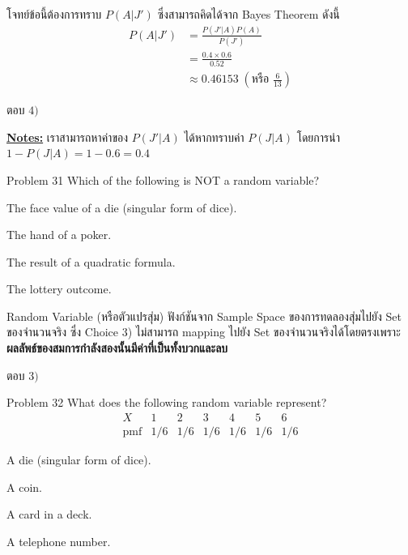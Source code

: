 \documentclass[11pt]{scrartcl}
\begin{document}
\begin{solutionbox}
  โจทย์ข้อนี้ต้องการทราบ $P(A|J')$ ซึ่งสามารถคิดได้จาก Bayes Theorem ดังนี้
  \begin{align*}
    P(A|J') &= \frac{P(J'|A)P(A)}{P(J')} \\
          &= \frac{0.4 \times 0.6}{0.52} \\
          &\approx 0.46153 \; \left(\text{หรือ } \frac{6}{13}\right)
  \end{align*}
  
  ตอบ $\boxed{4)}$

  \underline{\textbf{Notes:}}
  เราสามารถหาค่าของ $P(J'|A)$ ได้หากทราบค่า $P(J|A)$ โดยการนำ $1 - P(J|A) = 1-0.6 = 0.4$
\end{solutionbox}

\begin{problembox}{Problem 31}
Which of the following is NOT a random variable?
 
\begin{choices}
\item The face value of a die (singular form of dice).
\item The hand of a poker.
\item The result of a quadratic formula.
\item The lottery outcome.
\end{choices}
\end{problembox}

\begin{solutionbox}
  Random Variable (หรือตัวแปรสุ่ม) ฟังก์ชันจาก Sample Space ของการทดลองสุ่มไปยัง Set ของจำนวนจริง
  ซึ่ง Choice 3) ไม่สามารถ mapping ไปยัง Set ของจำนวนจริงได้โดยตรงเพราะ\textbf{ผลลัพธ์ของสมการกำลังสองนั้นมีค่าที่เป็นทั้งบวกและลบ}

  ตอบ $\boxed{3)}$
\end{solutionbox}

\begin{problembox}{Problem 32}
What does the following random variable represent?
\[
\begin{array}{c|cccccc}
X & 1 & 2 & 3 & 4 & 5 & 6 \\
\hline
\text{pmf} & 1/6 & 1/6 & 1/6 & 1/6 & 1/6 & 1/6
\end{array}
\]
 
\begin{choices}
\item A die (singular form of dice).
\item A coin.
\item A card in a deck.
\item A telephone number.
\end{choices}
\end{problembox}
\end{document}
